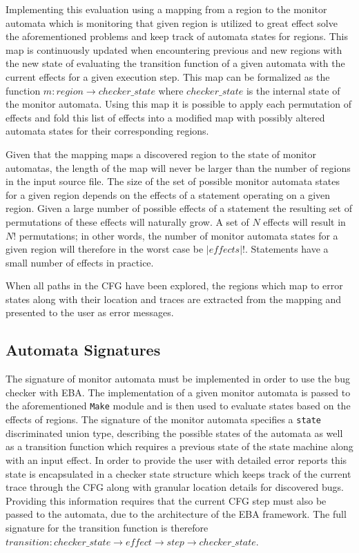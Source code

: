 \newpar Implementing this evaluation using a mapping from a region to the monitor automata which is monitoring that given region is utilized to great effect solve the aforementioned problems and keep track of automata states for regions. This map is continuously updated when encountering previous and new regions with the new state of evaluating the transition function of a given automata with the current effects for a given execution step. This map can be formalized as the function $m: region \rightarrow { checker\_state }$ where $ checker\_state $ is the internal state of the monitor automata. Using this map it is possible to apply each permutation of effects and fold this list of effects into a modified map with possibly altered automata states for their corresponding regions. 

\newpar Given that the mapping maps a discovered region to the state of monitor automatas, the length of the map will never be larger than the number of regions in the input source file. The size of the set of possible monitor automata states for a given region depends on the effects of a statement operating on a given region. Given a large number of possible effects of a statement the resulting set of permutations of these effects will naturally grow. A set of $N$ effects will result in $N!$ permutations; in other words, the number of monitor automata states for a given region will therefore in the worst case be $|effects|!$. Statements have a small number of effects in practice.

\newpar When all paths  in the CFG have been explored, the regions which map to error states along with their location and traces are extracted from the mapping and presented to the user as error messages. 

\subsection{Automata Signatures}

The signature of monitor automata must be implemented in order to use the bug checker with EBA. The implementation of a given monitor automata is passed to the aforementioned \texttt{Make} module and is then used to evaluate states based on the effects of regions. The signature of the monitor automata specifies a \texttt{state} discriminated union type, describing the possible states of the automata as well as a transition function which requires a previous state of the state machine along with an input effect. In order to provide the user with detailed error reports this state is encapsulated in a checker state structure which keeps track of the current trace through the CFG along with granular location details for discovered bugs. Providing this information requires that the current CFG step must also be passed to the automata, due to the architecture of the EBA framework. The full signature for the transition function is therefore $transition: \mathit{checker\_state} \rightarrow \mathit{effect} \rightarrow \mathit{step} \rightarrow \mathit{checker\_state}$. 